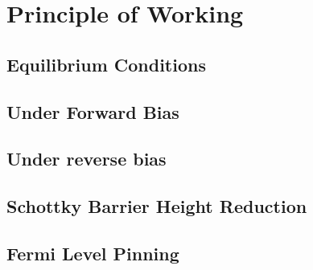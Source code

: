 \section{Principle of Working}
\subsection{Equilibrium Conditions}
\subsection{Under Forward Bias}
\subsection{Under reverse bias}
\subsection{Schottky Barrier Height Reduction}
\subsection{Fermi Level Pinning}
